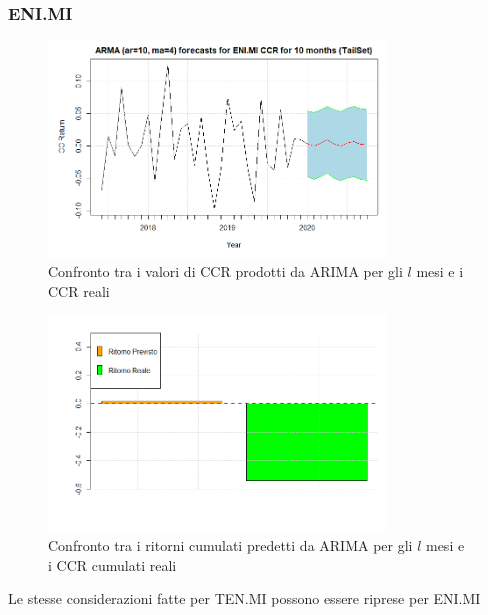 \documentclass[12pt]{article}
\begin{document}
\subsubsection{ENI.MI}
\begin{figure}[!htb]
    \centering
    \includegraphics[width=0.8\textwidth]{immagini/foreENI.png}
    \caption{Confronto tra i valori di CCR prodotti da ARIMA per gli $l$ mesi e i CCR reali}
\end{figure}
\FloatBarrier
\begin{figure}[!htb]
    \centering
    \includegraphics[width=0.8\textwidth]{immagini/foreENIbar.png}
    \caption{Confronto tra i ritorni cumulati predetti da ARIMA per gli $l$ mesi e i CCR cumulati reali}
\end{figure}
\FloatBarrier
Le stesse considerazioni fatte per TEN.MI possono essere riprese per ENI.MI
\end{document}
